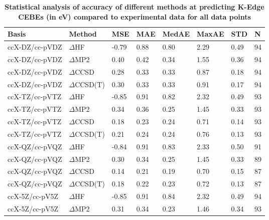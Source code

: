 \begin{table}
  \caption{\textbf{Statistical analysis of accuracy of different methods at predicting K-Edge CEBEs (in eV) compared to experimental data for all data points}}
  \begin{tabular}{l l l l l l l l }
    \toprule
    \textbf{Basis} & \textbf{Method} & \textbf{MSE} & \textbf{MAE} & \textbf{MedAE} & \textbf{MaxAE} & \textbf{STD} & \textbf{N} \\ 
    \midrule
    ccX-DZ/cc-pVDZ & $\Delta$HF & -0.79 & 0.88 & 0.80 & 2.29 & 0.49 & 94 \\ 
    ccX-DZ/cc-pVDZ & $\Delta$MP2 & 0.40 & 0.42 & 0.34 & 1.55 & 0.36 & 94 \\ 
    ccX-DZ/cc-pVDZ & $\Delta$CCSD & 0.28 & 0.33 & 0.33 & 0.87 & 0.18 & 94 \\ 
    ccX-DZ/cc-pVDZ & $\Delta$CCSD(T) & 0.30 & 0.33 & 0.33 & 0.91 & 0.17 & 94 \\ 
    ccX-TZ/cc-pVTZ & $\Delta$HF & -0.85 & 0.91 & 0.82 & 2.32 & 0.49 & 93 \\ 
    ccX-TZ/cc-pVTZ & $\Delta$MP2 & 0.34 & 0.36 & 0.25 & 1.45 & 0.33 & 93 \\ 
    ccX-TZ/cc-pVTZ & $\Delta$CCSD & 0.18 & 0.23 & 0.24 & 0.71 & 0.14 & 93 \\ 
    ccX-TZ/cc-pVTZ & $\Delta$CCSD(T) & 0.21 & 0.24 & 0.24 & 0.76 & 0.13 & 93 \\ 
    ccX-QZ/cc-pVQZ & $\Delta$HF & -0.84 & 0.91 & 0.83 & 2.33 & 0.50 & 91 \\ 
    ccX-QZ/cc-pVQZ & $\Delta$MP2 & 0.30 & 0.34 & 0.25 & 1.45 & 0.33 & 89 \\ 
    ccX-QZ/cc-pVQZ & $\Delta$CCSD & 0.14 & 0.21 & 0.19 & 0.70 & 0.15 & 87 \\ 
    ccX-QZ/cc-pVQZ & $\Delta$CCSD(T) & 0.18 & 0.22 & 0.23 & 0.72 & 0.13 & 87 \\ 
    ccX-5Z/cc-pV5Z & $\Delta$HF & -0.85 & 0.91 & 0.84 & 2.32 & 0.49 & 94 \\ 
    ccX-5Z/cc-pV5Z & $\Delta$MP2 & 0.31 & 0.34 & 0.23 & 1.46 & 0.34 & 93 \\ 
    \bottomrule
  \end{tabular}
\end{table}
